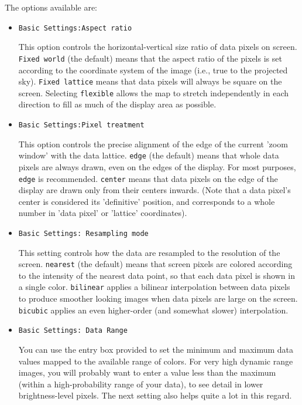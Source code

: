 The options available are:
\begin{itemize}

\item {\tt Basic Settings:Aspect ratio}

This option controls the horizontal-vertical size ratio of data pixels
on screen.  {\tt Fixed world} (the default) means that the aspect
ratio of the pixels is set according to the coordinate system of
the image (i.e., true to the projected sky). {\tt Fixed lattice}
means that data pixels will always be square on the screen.  Selecting
{\tt flexible} allows the map to stretch independently in each
direction to fill as much of the display area as possible.

\item {\tt Basic Settings:Pixel treatment}

This option controls the precise alignment of the edge of the current
'zoom window' with the data lattice.  {\tt edge} (the default) means
that whole data pixels are always drawn, even on the edges of the display.
For most purposes, {\tt edge} is recommended.  {\tt center} means that
data pixels on the edge of the display are drawn only from their centers
inwards. (Note that a data pixel's center is considered its 'definitive'
position, and corresponds to a whole number in 'data pixel' or 'lattice'
coordinates).

\item {\tt Basic Settings: Resampling mode}

This setting controls how the data are resampled to the resolution of
the screen.  {\tt nearest} (the default) means that screen pixels are
colored according to the intensity of the nearest data point, so that
each data pixel is shown in a single color. {\tt bilinear} applies a
bilinear interpolation between data pixels to produce smoother looking images
when data pixels are large on the screen.  {\tt bicubic} applies an
even higher-order (and somewhat slower) interpolation.

\item {\tt Basic Settings: Data Range}

You can use the entry box provided to set the minimum and maximum data values
mapped to the available range of colors. For very high dynamic range images,
you will probably want to enter a value less than the maximum (within a high-probability range of your data), to see detail in lower brightness-level
pixels.  The next setting also helps quite a lot in this regard.


\end{itemize}
